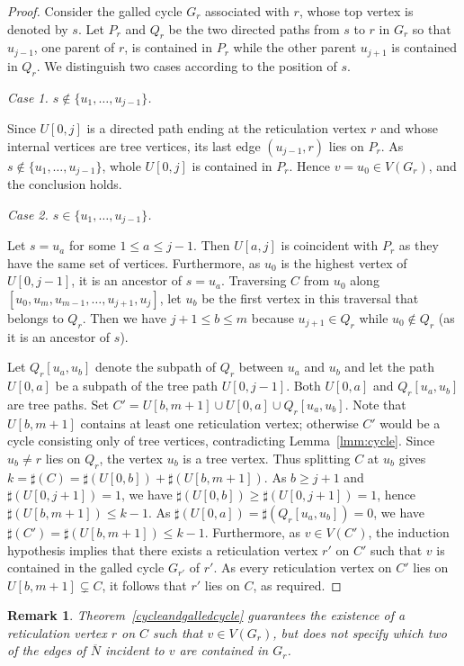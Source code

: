 \documentclass[pdflatex,sn-mathphys-num]{sn-jnl}
\newcommand{\nret}[1]{\sharp({#1})}
\theoremstyle{thmstyleone}%
\theoremstyle{thmstyletwo}%
\newtheorem{remark}{Remark}%
\theoremstyle{thmstylethree}%
\begin{document}
\begin{proof}
Consider the galled cycle $G_r$ associated with $r$, whose top vertex is denoted by $s$. Let $P_r$ and $Q_r$ be the two directed paths from $s$ to $r$ in $G_r$ so that  $u_{j-1}$, one parent of $r$, is contained in $P_r$ while the other parent $u_{j+1}$ is contained in $Q_r$.
We distinguish two cases according to the position of $s$.


\smallskip
\noindent
\textit{Case 1. $s\notin \{u_1,\dots,u_{j-1}\}$.}


Since $U[0,j]$ is a directed path ending at the reticulation vertex $r$ and whose internal vertices are tree vertices, its last edge $(u_{j-1},r)$ lies on $P_r$. As $s\notin \{u_1,\dots,u_{j-1}\}$, whole $U[0,j]$ is contained in $P_r$. Hence $v=u_0\in V(G_r)$, and the conclusion holds.

\smallskip
\noindent
\textit{Case 2. $s\in \{u_1,\dots,u_{j-1}\}$.}

Let $s = u_a$ for some $1 \leq a \leq j-1$. Then $U[a,j]$ is coincident with $P_r$ as they have the same set of vertices. Furthermore, as $u_0$ is the highest vertex of $U[0,j-1]$, it is an ancestor of $s=u_a$. Traversing $C$ from $u_0$ along $[u_0,u_m,u_{m-1},\dots,u_{j+1},u_j]$, let $u_b$ be the first vertex in this traversal 
that belongs to $Q_r$. Then
we have $j+1\le b\le m$ because $u_{j+1}\in Q_r$ while $u_0\not \in Q_r$ (as it is an ancestor of $s$). 


Let $Q_r[u_a,u_b]$ denote the subpath of $Q_r$ between $u_a$ and $u_b$ and let the path $U[0,a]$ be a subpath of the tree path $U[0,j-1]$. Both $U[0,a]$ and $Q_r[u_a,u_b]$ are tree paths.  Set $C'=U[b,m+1]\cup U[0,a]\cup Q_r[u_a,u_b]$. Note that $U[b,m+1]$ contains at least one reticulation vertex; otherwise $C'$ would be a cycle consisting only of tree vertices, contradicting Lemma~\ref{lmm:cycle}. Since $u_b\ne r$ lies on $Q_r$, the vertex $u_b$ is a tree vertex. Thus splitting $C$ at $u_b$ gives $k=\nret{C}=\nret{U[0,b]}+\nret{U[b,m+1]}$. As $b\ge j+1$ and $\nret{U[0,j+1]}=1$, we have $\nret{U[0,b]}\ge\nret{U[0,j+1]}=1$, hence $\nret{U[b,m+1]}\le k-1$. As $\nret{U[0,a]}=\nret{Q_r[u_a,u_b]}=0$, we have $\nret{C'}=\nret{U[b,m+1]}\le k-1$. Furthermore, as $v \in V(C')$, the induction hypothesis implies that there exists a reticulation vertex $r'$ on $C'$ such that $v$ is contained in the galled cycle $G_{r'}$ of $r'$.
As every reticulation vertex on $C'$ lies on $U[b,m+1]\subsetneq C$, it follows that $r'$ lies on $C$, as required.
\end{proof}


\begin{remark} \label{rmk:edgeambig}
Theorem~\ref{cycleandgalledcycle} guarantees the existence of a reticulation vertex $r$ on $C$ such that $v \in V(G_r)$, but does not specify which two of the edges of $\overline{N}$ incident to $v$ are contained in $G_r$.
\end{remark}
\end{document}
